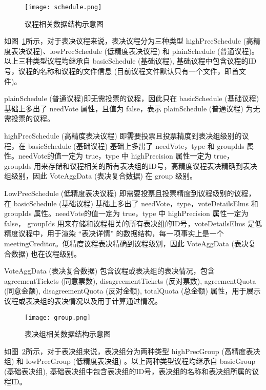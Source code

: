     \begin{figure}[!htp]
      \centering
      \texttt{[image: schedule.png]}
      \caption{议程相关数据结构示意图}
      \label{fig:schedule}
    \end{figure}

    如图~\ref{fig:schedule}所示，对于表决议程来说，表决议程分为三种类型 highPrecSchedule (高精度表决议程)、lowPrecSchedule (低精度表决议程) 和 plainSchedule (普通议程)。以上三种类型议程均继承自 basicSchedule (基础议程), 基础议程中包含议程的ID号，议程的名称和议程的文件信息 (目前议程文件默认只有一个文件，即首文件)。

  plainSchedule (普通议程)即无需投票的议程，因此只在 basicSchedule (基础议程) 基础上多出了 needVote 属性，且值为 false，表示 plainSchedule (普通议程) 为无需投票的议程。

  highPrecSchedule (高精度表决议程) 即需要投票且投票精度到表决组级别的议程，在 basicSchedule (基础议程) 基础上多出了 needVote，type 和 groupIds 属性。needVote的值一定为 true，type 中 highPrecision 属性一定为 true， groupIds 用来存储和议程相关的所有表决组的ID号，高精度议程表决精确到表决组级别，因此 VoteAggData (表决复合数据) 在 group 级别。

  LowPrecSchedule (低精度表决议程) 即需要投票且投票精度到议程级别的议程，在 basicSchedule (基础议程) 基础上多出了 needVote，type，voteDetailsElms 和 groupIds 属性。needVote的值一定为 true，type 中 highPrecision 属性一定为 false， groupIds 用来存储和议程相关的所有表决组的ID号，voteDetailsElms 是低精度议程中，用于渲染 “表决详情” 的数据结构，每一项事实上是一个 meetingCreditor。低精度议程表决精确到议程级别，因此 VoteAggData (表决复合数据) 也在议程级别。

  VoteAggData (表决复合数据) 包含议程或表决组的表决情况，包含 agreementTickets (同意票数), disagreementTickets (反对票数), agreementQuota (同意金额), disagreementQuota (反对金额), totalQuota (总金额) 属性，用于展示议程或表决组的表决情况以及用于计算通过情况。

  \begin{figure}[!htp]
    \centering
    \texttt{[image: group.png]}
    \caption{表决组相关数据结构示意图}
   \label{fig:group}
  \end{figure}

  如图~\ref{fig:group}所示，对于表决组来说，表决组分为两种类型 highPrecGroup (高精度表决组) 和 lowPrecGroup (低精度表决组) 。以上两种类型议程均继承自 basicGroup (基础表决组), 基础表决组中包含表决组的ID号，表决组的名称和表决组所属的议程ID。

